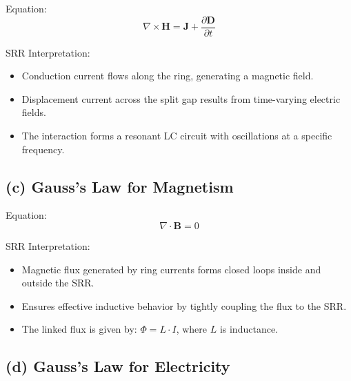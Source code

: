 \documentclass[conference]{IEEEtran}
\begin{document}
Equation:
\[
\nabla \times \mathbf{H} = \mathbf{J} + \frac{\partial \mathbf{D}}{\partial t}
\]


SRR Interpretation:
\begin{itemize}
    \item Conduction current flows along the ring, generating a magnetic field.
    \item Displacement current across the split gap results from time-varying electric fields.
    \item The interaction forms a resonant LC circuit with oscillations at a specific frequency.
\end{itemize}

\subsection*{(c) Gauss’s Law for Magnetism}

Equation:
\[
\nabla \cdot \mathbf{B} = 0
\]


SRR Interpretation:
\begin{itemize}
    \item Magnetic flux generated by ring currents forms closed loops inside and outside the SRR.
    \item Ensures effective inductive behavior by tightly coupling the flux to the SRR.
    \item The linked flux is given by: $\Phi = L \cdot I$, where $L$ is inductance.
\end{itemize}

\subsection*{(d) Gauss’s Law for Electricity}
\end{document}
